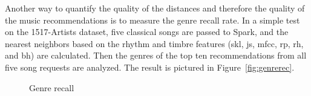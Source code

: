 Another way to quantify the quality of the distances and therefore the quality of the music recommendations is to measure the genre recall rate. In a simple test on the 1517-Artists dataset, five classical songs are passed to Spark, and the nearest neighbors based on the rhythm and timbre features (skl, js, mfcc, rp, rh, and bh) are calculated. Then the genres of the top ten recommendations from all five song requests are analyzed. The result is pictured in Figure~\ref{fig:genrerec}.  

\begin{figure}[htbp]
	\centering
	\caption{Genre recall}
	\label{fig:1517gen}
\end{figure}

